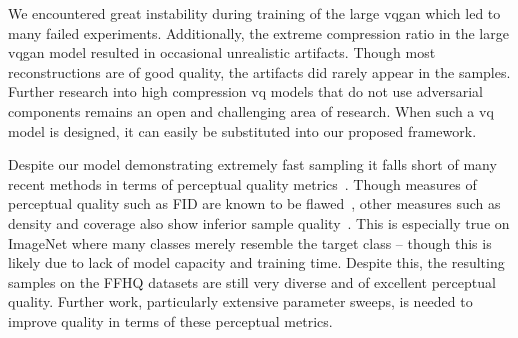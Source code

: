 We encountered great instability during training of the large \gls{vqgan} which
led to many failed experiments. Additionally, the extreme compression ratio in
the large \gls{vqgan} model resulted in occasional unrealistic artifacts. Though
most reconstructions are of good quality, the artifacts did rarely appear in the
samples. Further research into high compression \gls{vq} models that do not use
adversarial components remains an open and challenging area of research. When
such a \gls{vq} model is designed, it can easily be substituted into our
proposed framework.

Despite our model demonstrating extremely fast sampling it falls short of many
recent methods in terms of perceptual quality
metrics~\cite{bondtaylor2021unleashing}. Though measures of perceptual quality
such as FID are known to be flawed~\cite{chong2020effectively}, other measures
such as density and coverage also show inferior sample
quality~\cite{ferjad2020icml}. This is especially true on ImageNet where many
classes merely resemble the target class -- though this is likely due to lack of
model capacity and training time. Despite this, the resulting samples on the
FFHQ datasets are still very diverse and of excellent perceptual quality.
Further work, particularly extensive parameter sweeps, is needed to improve
quality in terms of these perceptual metrics.
